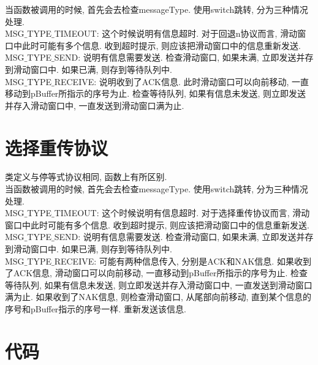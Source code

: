 \documentclass[a4paper,12pt,notitlepage]{article}
\begin{document}
	当函数被调用的时候, 首先会去检查messageType. 使用switch跳转, 分为三种情况处理. \\
	
	MSG$\_$TYPE$\_$TIMEOUT: 这个时候说明有信息超时. 对于回退n协议而言, 滑动窗口中此时可能有多个信息. 收到超时提示, 则应该把滑动窗口中的信息重新发送. \\
	
	MSG$\_$TYPE$\_$SEND: 说明有信息需要发送. 检查滑动窗口, 如果未满, 立即发送并存到滑动窗口中. 如果已满, 则存到等待队列中. \\
	
	MSG$\_$TYPE$\_$RECEIVE: 说明收到了ACK信息. 此时滑动窗口可以向前移动, 一直移动到pBuffer所指示的序号为止. 检查等待队列, 如果有信息未发送, 则立即发送并存入滑动窗口中, 一直发送到滑动窗口满为止.

\section{选择重传协议}

	类定义与停等式协议相同, 函数上有所区别. \\
	
	当函数被调用的时候, 首先会去检查messageType. 使用switch跳转, 分为三种情况处理. \\
	
	MSG$\_$TYPE$\_$TIMEOUT: 这个时候说明有信息超时. 对于选择重传协议而言, 滑动窗口中此时可能有多个信息. 收到超时提示, 则应该把滑动窗口中的信息重新发送. \\
	
	MSG$\_$TYPE$\_$SEND: 说明有信息需要发送. 检查滑动窗口, 如果未满, 立即发送并存到滑动窗口中. 如果已满, 则存到等待队列中. \\
	
	MSG$\_$TYPE$\_$RECEIVE: 可能有两种信息传入, 分别是ACK和NAK信息. 如果收到了ACK信息, 滑动窗口可以向前移动, 一直移动到pBuffer所指示的序号为止. 检查等待队列, 如果有信息未发送, 则立即发送并存入滑动窗口中, 一直发送到滑动窗口满为止. 如果收到了NAK信息, 则检查滑动窗口, 从尾部向前移动, 直到某个信息的序号和pBuffer指示的序号一样. 重新发送该信息.
	
\section{代码}
\end{document}
